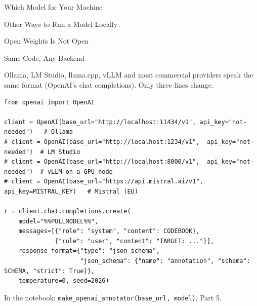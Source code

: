 \begin{frame}{Which Model for Your Machine}

\small

\end{frame}

\begin{frame}{Other Ways to Run a Model Locally}

\small

\end{frame}

\begin{frame}{Open Weights Is Not Open}

\small

\end{frame}

\begin{frame}[fragile]{Same Code, Any Backend}

\small
Ollama, LM Studio, llama.cpp, vLLM and most commercial providers speak the same format (OpenAI's chat completions). Only three lines change.

\vspace{0.15cm}
{\scriptsize
\begin{verbatim}
from openai import OpenAI

client = OpenAI(base_url="http://localhost:11434/v1", api_key="not-needed")   # Ollama
# client = OpenAI(base_url="http://localhost:1234/v1",  api_key="not-needed")  # LM Studio
# client = OpenAI(base_url="http://localhost:8000/v1",  api_key="not-needed")  # vLLM on a GPU node
# client = OpenAI(base_url="https://api.mistral.ai/v1", api_key=MISTRAL_KEY)   # Mistral (EU)

r = client.chat.completions.create(
    model="%%PULLMODEL%%",
    messages=[{"role": "system", "content": CODEBOOK},
              {"role": "user", "content": "TARGET: ..."}],
    response_format={"type": "json_schema",
                     "json_schema": {"name": "annotation", "schema": SCHEMA, "strict": True}},
    temperature=0, seed=2026)
\end{verbatim}}

\vspace{0.1cm}
{\footnotesize In the notebook: \texttt{make\_openai\_annotator(base\_url, model)}, Part 5.}

\end{frame}

